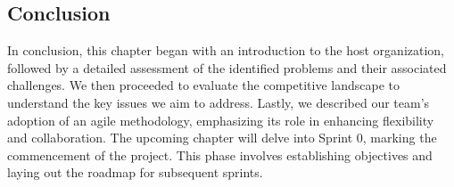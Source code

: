 \subsection*{Conclusion}

In conclusion, this chapter began with an introduction to the host organization, followed by a detailed assessment of the identified problems and their associated challenges. We then proceeded to evaluate the competitive landscape to understand the key issues we aim to address. Lastly, we described our team’s adoption of an agile methodology, emphasizing its role in enhancing flexibility and collaboration. The upcoming chapter will delve into Sprint 0, marking the commencement of the project. This phase involves establishing objectives and laying out the roadmap for subsequent sprints.

